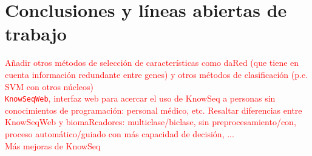 \chapter{Conclusiones y líneas abiertas de trabajo}

\textcolor{red}{Añadir otros métodos de selección de características como daRed (que tiene en cuenta información redundante entre genes) y otros métodos de clasificación (p.e. SVM con otros núcleos)}\\

\textcolor{red}{\texttt{KnowSeqWeb}, interfaz web para acercar el uso de KnowSeq a personas sin conocimientos de programación: personal médico, etc. Resaltar diferencias entre KnowSeqWeb y biomaRcadores: multiclase/biclase, sin preprocesamiento/con, proceso automático/guiado con más capacidad de decisión, ...}\\

\textcolor{red}{Más mejoras de KnowSeq}



